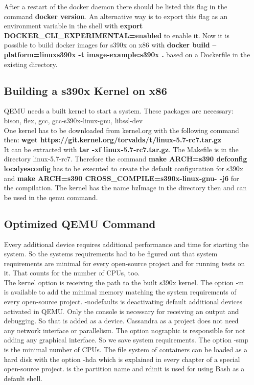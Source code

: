 After a restart of the docker daemon there should be listed this flag in the command \textbf{docker version}. An alternative way is to export this flag as an environment variable in the shell with \textbf{export DOCKER\_CLI\_EXPERIMENTAL=enabled} to enable it. Now it is possible to build docker images for s390x on x86 with \textbf{docker build --platform=linux\/s390x -t image-example:s390x .} based on a Dockerfile in the existing directory.

 

 

\subsection{Building a s390x Kernel on x86}

QEMU needs a built kernel to start a system. These packages are necessary: \\
bison, flex, gcc, gcc-s390x-linux-gnu, libssl-dev \\
One kernel has to be downloaded from kernel.org with the following command then: \textbf{wget https://git.kernel.org/torvalds/t/linux-5.7-rc7.tar.gz}\\
It can be extracted with \textbf{tar -xf  linux-5.7-rc7.tar.gz}. The Makefile is in the directory linux-5.7-rc7. Therefore the command \textbf{make ARCH=s390 defconfig localyesconfig} has to be executed to create the default configuration for s390x and \textbf{make ARCH=s390 CROSS_COMPILE=s390x-linux-gnu- -j6} for the compilation. The kernel has the name bzImage in the directory  then and can be used in the qemu command.

\subsection{Optimized QEMU Command}

Every additional device requires additional performance and time for starting the system. So the systems requirements had to be figured out that system requirements are minimal for every open-source project and for running tests on it. That counts for the number of CPUs, too. \\

The kernel option is receiving the path to the built s390x kernel. The option -m is available to add the minimal memory matching the system requirements of every open-source project. -nodefaults is deactivating default additional devices activated in QEMU. Only the console is necessary for receiving an output and debugging. So that is added as a device. Cassandra as a project does not need any network interface or parallelism. The option nographic is responsible for not adding any graphical interface. So we save system requirements. The option -smp is the minimal number of CPUs. The file system of containers can be loaded as a hard disk with the option -hda which is explained in every chapter of a special open-source project.  is the partition name and rdinit is used for using Bash as a default shell. \\



